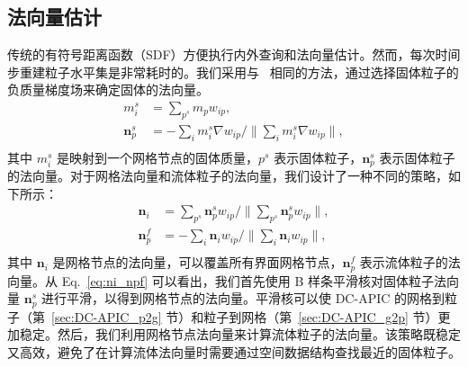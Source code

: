 \subsection{法向量估计}
传统的有符号距离函数（SDF）方便执行内外查询和法向量估计。然而，每次时间步重建粒子水平集是非常耗时的。我们采用与~\cite{fang2020iq} 相同的方法，通过选择固体粒子的负质量梯度场来确定固体的法向量。
\begin{equation}
\begin{aligned}
m_i^s &= \sum_{p^s} m_p w_{ip},\\
\mathbf{n}_p^s &= -\sum_i m_i^s \nabla w_{ip} / \| \sum_i m_i^s \nabla w_{ip} \| ,\\
\end{aligned}
\end{equation}
其中 $m_i^s$ 是映射到一个网格节点的固体质量，$p^s$ 表示固体粒子，$\mathbf{n}_p^s$ 表示固体粒子的法向量。对于网格法向量和流体粒子的法向量，我们设计了一种不同的策略，如下所示：
\begin{equation}
\label{eq:ni_npf}
\begin{aligned}
\mathbf{n}_i &= \sum_{p^s} \mathbf{n}_p^s w_{ip} / \| \sum_{p^s} \mathbf{n}_p^s w_{ip} \| ,\\
\mathbf{n}_p^f &= -\sum_i \mathbf{n}_i w_{ip} / \| \sum_i \mathbf{n}_i w_{ip} \|,\\
\end{aligned}
\end{equation}
其中 $\mathbf{n}_i$ 是网格节点的法向量，可以覆盖所有界面网格节点，$\mathbf{n}_p^f$ 表示流体粒子的法向量。从 Eq.~\eqref{eq:ni_npf} 可以看出，我们首先使用 B 样条平滑核对固体粒子法向量 $\mathbf{n}_p^s$ 进行平滑，以得到网格节点的法向量。平滑核可以使 DC-APIC 的网格到粒子（第~\ref{sec:DC-APIC_p2g} 节）和粒子到网格（第~\ref{sec:DC-APIC_g2p} 节）更加稳定。然后，我们利用网格节点法向量来计算流体粒子的法向量。该策略既稳定又高效，避免了在计算流体法向量时需要通过空间数据结构查找最近的固体粒子。


